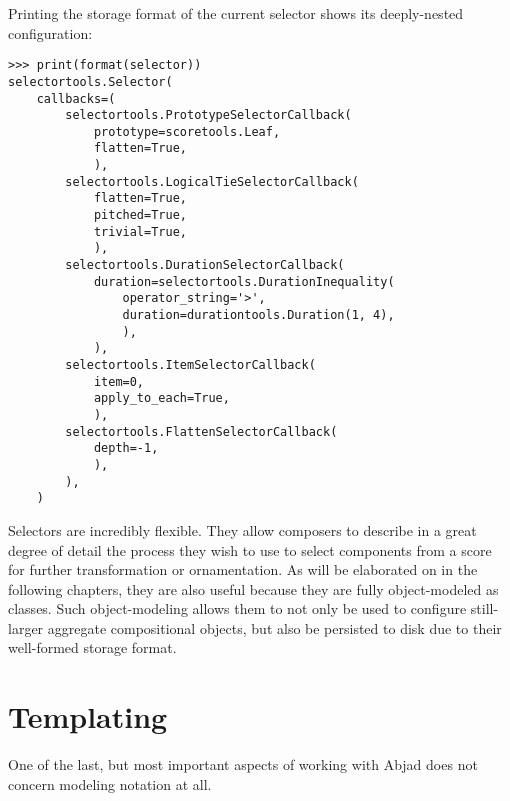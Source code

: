 \noindent Printing the storage format of the current selector shows its
deeply-nested configuration:

\begin{comment}
<abjad>
print(format(selector))
</abjad>
\end{comment}

\begin{abjadbookoutput}
\begin{singlespacing}
\vspace{-0.5\baselineskip}
\begin{lstlisting}
>>> print(format(selector))
selectortools.Selector(
    callbacks=(
        selectortools.PrototypeSelectorCallback(
            prototype=scoretools.Leaf,
            flatten=True,
            ),
        selectortools.LogicalTieSelectorCallback(
            flatten=True,
            pitched=True,
            trivial=True,
            ),
        selectortools.DurationSelectorCallback(
            duration=selectortools.DurationInequality(
                operator_string='>',
                duration=durationtools.Duration(1, 4),
                ),
            ),
        selectortools.ItemSelectorCallback(
            item=0,
            apply_to_each=True,
            ),
        selectortools.FlattenSelectorCallback(
            depth=-1,
            ),
        ),
    )
\end{lstlisting}
\end{singlespacing}
\end{abjadbookoutput}

\noindent Selectors are incredibly flexible. They allow composers to describe
in a great degree of detail the process they wish to use to select components
from a score for further transformation or ornamentation. As will be elaborated
on in the following chapters, they are also useful because they are fully
object-modeled as classes. Such object-modeling allows them to not only be used
to configure still-larger aggregate compositional objects, but also be
persisted to disk due to their well-formed storage format.

\section{Templating}


One of the last, but most important aspects of working with Abjad does not
concern modeling notation at all.

